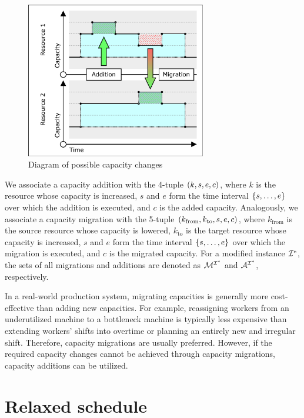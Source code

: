 \begin{figure}
    \centering
    \includegraphics[width=0.7\textwidth]{img/Capacities-Changes.pdf}
    \caption{Diagram of possible capacity changes}
    \label{fig:CapacityChanges}
\end{figure}

We associate a capacity addition with the 4-tuple $(k, s, e, c)$, where
$k$ is the resource whose capacity is increased,
$s$ and $e$ form the time interval $\{{s}, \dots, {e}\}$ over which the addition is executed, and
$c$ is the added capacity.
Analogously, we associate a capacity migration
with the 5-tuple $(k_{\text{from}}, k_{\text{to}}, s, e, c)$, where
$k_{\text{from}}$ is the source resource whose capacity is lowered,
$k_{\text{to}}$ is the target resource whose capacity is increased,
$s$ and $e$ form the time interval $\{{s}, \dots, {e}\}$ over which the migration is executed, and
$c$ is the migrated capacity.
For a modified instance $\mathcal{I}^*$, the sets of all migrations and additions are denoted as
$\mathcal{M}^{\mathcal{I}^*}$ and $\mathcal{A}^{\mathcal{I}^*}$, respectively.

In a real-world production system,
migrating capacities is generally more cost-effective than adding new capacities.
For example, reassigning workers from an underutilized machine to a bottleneck machine
is typically less expensive than extending workers' shifts into overtime
or planning an entirely new and irregular shift.
Therefore, capacity migrations are usually preferred.
However, if the required capacity changes cannot be achieved through capacity migrations,
capacity additions can be utilized.

\section{Relaxed schedule} \label{sec:problem-statement/relaxed-schedule}

